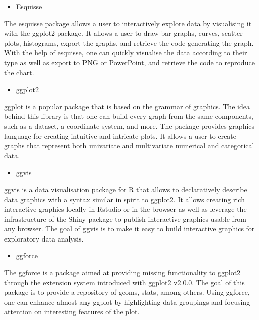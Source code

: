 \documentclass[
]{report}
\providecommand{\tightlist}{%
  \setlength{\itemsep}{0pt}\setlength{\parskip}{0pt}}
\begin{document}
\begin{itemize}
\tightlist
\item
  Esquisse
\end{itemize}

The esquisse package allows a user to interactively explore data by visualising it with the ggplot2 package. It allows a user to draw bar graphs, curves, scatter plots, histograms, export the graphs, and retrieve the code generating the graph. With the help of esquisse, one can quickly visualise the data according to their type as well as export to PNG or PowerPoint, and retrieve the code to reproduce the chart.

\begin{itemize}
\tightlist
\item
  ggplot2
\end{itemize}

ggplot is a popular package that is based on the grammar of graphics. The idea behind this library is that one can build every graph from the same components, such as a dataset, a coordinate system, and more. The package provides graphics language for creating intuitive and intricate plots. It allows a user to create graphs that represent both univariate and multivariate numerical and categorical data.

\begin{itemize}
\tightlist
\item
  ggvis
\end{itemize}

ggvis is a data visualisation package for R that allows to declaratively describe data graphics with a syntax similar in spirit to ggplot2. It allows creating rich interactive graphics locally in Rstudio or in the browser as well as leverage the infrastructure of the Shiny package to publish interactive graphics usable from any browser. The goal of ggvis is to make it easy to build interactive graphics for exploratory data analysis.

\begin{itemize}
\tightlist
\item
  ggforce
\end{itemize}

The ggforce is a package aimed at providing missing functionality to ggplot2 through the extension system introduced with ggplot2 v2.0.0. The goal of this package is to provide a repository of geoms, stats, among others. Using ggforce, one can enhance almost any ggplot by highlighting data groupings and focusing attention on interesting features of the plot.
\end{document}
